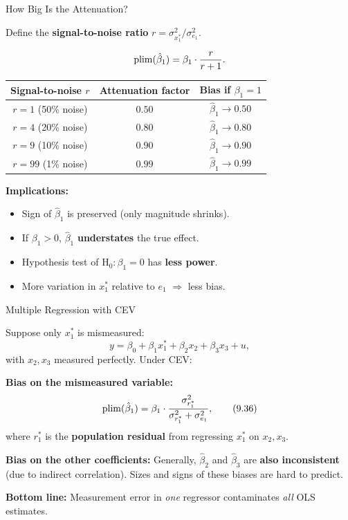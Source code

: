 \documentclass[aspectratio=169, 12pt]{beamer}
\begin{document}
\begin{frame}[shrink=10]{How Big Is the Attenuation?}

  Define the \textbf{signal-to-noise ratio} $r = \sigma_{x_1^*}^2 / \sigma_{e_1}^2$.

  \[
    \operatorname{plim}(\hat{\beta}_1) = \beta_1 \cdot \frac{r}{r + 1}.
  \]

  \begin{center}\footnotesize
  \begin{tabular}{c|c|c}
  \hline
  Signal-to-noise $r$ & Attenuation factor & Bias if $\beta_1 = 1$ \\
  \hline
  $r = 1$ (50\% noise) & $0.50$ & $\hat\beta_1 \to 0.50$ \\
  $r = 4$ (20\% noise) & $0.80$ & $\hat\beta_1 \to 0.80$ \\
  $r = 9$ (10\% noise) & $0.90$ & $\hat\beta_1 \to 0.90$ \\
  $r = 99$ (1\% noise) & $0.99$ & $\hat\beta_1 \to 0.99$ \\
  \hline
  \end{tabular}
  \end{center}

  \begin{keybox}
    \textbf{Implications:}
    \begin{itemize}\setlength{\itemsep}{1pt}
      \item Sign of $\hat\beta_1$ is preserved (only magnitude shrinks).
      \item If $\beta_1 > 0$, $\hat\beta_1$ \textbf{understates} the true effect.
      \item Hypothesis test of $\text{H}_0: \beta_1 = 0$ has \textbf{less power}.
      \item More variation in $x_1^*$ relative to $e_1$ $\Rightarrow$ less bias.
    \end{itemize}
  \end{keybox}

\end{frame}

\begin{frame}[shrink=15]{Multiple Regression with CEV}

  Suppose only $x_1^*$ is mismeasured:
  \[
    y = \beta_0 + \beta_1 x_1^* + \beta_2 x_2 + \beta_3 x_3 + u, \tag{9.34}
  \]
  with $x_2, x_3$ measured perfectly. Under CEV:

  \begin{highlightbox}
    \textbf{Bias on the mismeasured variable:}
    \[
      \operatorname{plim}(\hat{\beta}_1) = \beta_1 \cdot \frac{\sigma_{r_1^*}^2}{\sigma_{r_1^*}^2 + \sigma_{e_1}^2}, \tag{9.36}
    \]
    where $r_1^*$ is the \textbf{population residual} from regressing $x_1^*$ on $x_2, x_3$.

    \medskip
    \textbf{Bias on the other coefficients:} Generally, $\hat\beta_2$ and $\hat\beta_3$ are
    \textbf{also inconsistent} (due to indirect correlation). Sizes and signs of these biases
    are hard to predict.
  \end{highlightbox}

  \textbf{Bottom line:} Measurement error in \emph{one} regressor contaminates \emph{all} OLS
  estimates.

\end{frame}
\end{document}
